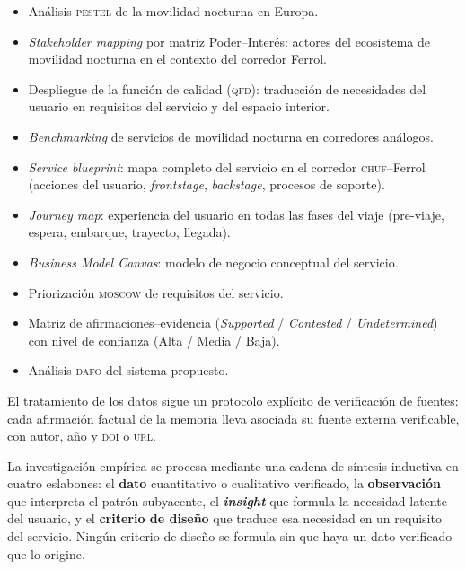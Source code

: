 \begin{itemize}[noitemsep]
  \item Análisis \textsc{pestel} de la movilidad nocturna en Europa.
  \item \textit{Stakeholder mapping} por matriz Poder--Interés: actores del ecosistema de movilidad nocturna en el contexto del corredor Ferrol.
  \item Despliegue de la función de calidad (\textsc{qfd}): traducción
        de necesidades del usuario en requisitos del servicio y del
        espacio interior.
  \item \textit{Benchmarking} de servicios de movilidad nocturna en corredores análogos.
  \item \textit{Service blueprint}: mapa completo del servicio en el
        corredor \textsc{chuf}--Ferrol (acciones del usuario,
        \textit{frontstage}, \textit{backstage}, procesos de soporte).
  \item \textit{Journey map}: experiencia del usuario en todas las fases
        del viaje (pre-viaje, espera, embarque, trayecto, llegada).
  \item \textit{Business Model Canvas}: modelo de negocio conceptual
        del servicio.
  \item Priorización \textsc{moscow} de requisitos del servicio.
  \item Matriz de afirmaciones--evidencia (\textit{Supported} /
        \textit{Contested} / \textit{Undetermined}) con nivel de
        confianza (Alta / Media / Baja).
  \item Análisis \textsc{dafo} del sistema propuesto.
\end{itemize}

El tratamiento de los datos sigue un protocolo explícito de verificación de
fuentes: cada afirmación factual de la memoria lleva asociada su fuente
externa verificable, con autor, año y \textsc{doi} o \textsc{url}.

La investigación empírica se procesa mediante una cadena de síntesis
inductiva en cuatro eslabones: el \textbf{dato} cuantitativo o cualitativo
verificado, la \textbf{observación} que interpreta el patrón subyacente,
el \textbf{\textit{insight}} que formula la necesidad latente del usuario,
y el \textbf{criterio de diseño} que traduce esa necesidad en un requisito
del servicio. Ningún criterio de diseño se formula sin que haya un dato
verificado que lo origine.


